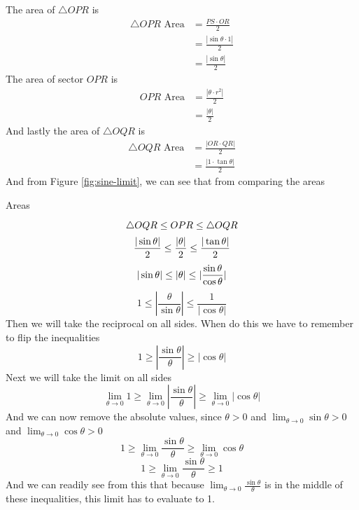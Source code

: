 \documentclass[working]{tuftebook}
\begin{document}
\begin{myproof}
The area of $\triangle OPR$ is 
\begin{align*}
    \triangle OPR \text{ Area}&= \frac{PS\cdot OR}{2}\\
                              &= \frac{| \sin \theta\cdot 1|}{2}\\ 
                              &= \frac{| \sin  \theta|}{2}
\end{align*}
The area of sector $OPR$ is
\begin{align*}
    OPR \text{ Area}&= \frac{ |\theta\cdot r^2|}{2}\\ 
                    &= \frac{ |\theta|}{2}
\end{align*}
And lastly the area of $\triangle OQR$ is 
\begin{align*}
    \triangle OQR \text{ Area}&= \frac{|OR\cdot QR|}{2}\\ 
                              &= \frac{|1\cdot \tan \theta|}{2}
\end{align*}
And from Figure \ref{fig:sine-limit}, we can see that from comparing the areas 
\begin{center}
    Areas
\end{center}
\vspace{-0.5em}
\[
    \triangle OQR \leq OPR \leq \triangle OQR\\
\]
\[
    \frac{| \sin \theta|}{2}\leq \frac{| \theta|}{2}\leq \frac{| \tan \theta|}{2}\\
\]
\[
    | \sin \theta|\leq |\theta|\leq | \frac{ \sin \theta}{ \cos \theta}|\\ 
\]
\[
    1\leq |\frac{ \theta}{ \sin \theta}|\leq \frac{1}{| \cos \theta|}
\]
Then we will take the reciprocal on all sides. When do this we have to remember to flip the inequalities 
\[
    1\geq | \frac{ \sin \theta}{ \theta}|\geq | \cos \theta|
\]
Next we will take the limit on all sides 
\[
    \lim_{ \theta\to 0}1\geq \lim_{ \theta\to 0}| \frac{ \sin \theta}{ \theta}|\geq \lim_{ \theta\to 0}| \cos \theta|
\]
And we can now remove the absolute values, since $\displaystyle \theta>0$ and $\displaystyle \lim_{ \theta\to 0} \sin \theta>0$ and $ \lim_{ \theta\to 0} \cos \theta>0$ 
\[
    1\geq \lim_{ \theta\to 0} \frac{ \sin \theta}{ \theta}\geq \lim_{ \theta\to 0} \cos \theta
\]
\[
    1\geq \lim_{ \theta\to 0} \frac{ \sin \theta}{ \theta}\geq 1
\]
And we can readily see from this that because $\displaystyle \lim_{ \theta\to 0} \frac{ \sin \theta}{ \theta}$ is in the middle of these inequalities, this limit has to evaluate to 1.


\end{myproof}
\end{document}
